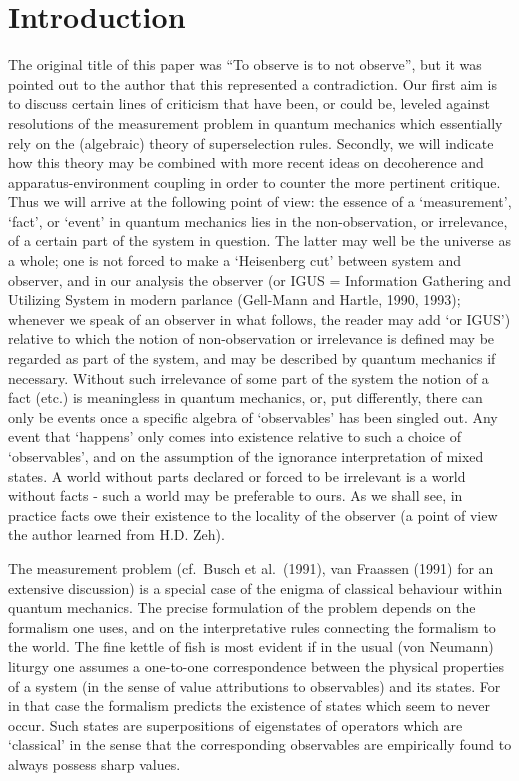 \documentclass[12pt,titlepage]{article}
\begin{document}
\section{Introduction}
The original title of this paper was ``To observe is to not observe'', but it
was pointed out to the
author that this represented a contradiction.  Our first aim  is to discuss
certain lines
of criticism that have been, or could be, leveled against  resolutions of the
measurement problem in
quantum mechanics which essentially rely on the (algebraic) theory of
superselection rules. Secondly,
we will indicate how this theory may be combined with more recent ideas on
decoherence and
apparatus-environment coupling in order to    counter the more  pertinent
critique.  Thus we will
arrive at the following  point of view: the essence of a   `measurement',
`fact', or `event' in
quantum mechanics lies in the   non-observation, or irrelevance, of a certain
part of the system in
question. The latter may well be the universe as a whole; one is not forced to
make a `Heisenberg
cut' between system and observer, and in our analysis the observer (or IGUS =
Information Gathering
and Utilizing System in modern parlance  (Gell-Mann and Hartle, 1990, 1993);
whenever we speak of an
observer in what follows, the reader may add `or IGUS') relative to which the
notion of
non-observation or irrelevance is defined may be regarded as part of the
system, and may be described
by quantum mechanics if necessary. Without such irrelevance of some part of the
system the notion of
a fact (etc.) is meaningless in quantum mechanics, or, put differently, there
can only be events once
a specific algebra of `observables' has been singled out. Any event that
`happens' only comes into
existence relative to such a choice of `observables', and on the assumption of
the ignorance
interpretation of mixed states.   A world without parts declared or forced to
be irrelevant is a
world without facts - such a world may be preferable to ours. As we shall see,
in practice facts owe
their existence to the locality of the observer (a point of view the author
learned from H.D. Zeh).

The measurement problem  (cf.\   Busch et al.\ (1991), van Fraassen (1991) for
an extensive
discussion) is a special case of the enigma of classical behaviour within
quantum mechanics. The precise formulation of the problem depends on the
formalism one uses, and on
the interpretative rules connecting the formalism to the world. The fine kettle
of fish is most
evident if in the usual (von Neumann) liturgy one assumes a one-to-one
correspondence between the
physical properties of a system (in the sense of value attributions to
observables) and its states.
For in that case the formalism predicts the existence of states which seem to
never occur.
Such states are superpositions of eigenstates of  operators which are
`classical' in the sense that
the corresponding observables are empirically found to  always possess sharp
values.
\end{document}
